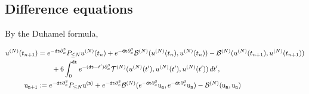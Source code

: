 \subsection{Difference equations}

By the Duhamel formula, 


    \begin{align}
        u^{(N)} (t_{n + 1}) 
            &=  e^{-\mathtt{dt} \partial_x^3}  P_{\leq N} u^{(N)}(t_n) + e^{-\mathtt{dt} \partial_x^3} \mathcal B^{(N)} (u^{(N)}(t_n), u^{(N)} (t_n)) - \mathcal B^{(N)} (u^{(N)} (t_{n + 1}), u^{(N)}(t_{n + 1})) \\
            &\qquad+ 6 \int_0^{\mathtt{dt}} e^{-(\mathtt{dt} - t') \partial_x^3} \mathcal T^{(N)} (u^{(N)}(t'), u^{(N)}(t'), u^{(N)}(t'))\, dt' ,  \\
        \mathtt{u_{n  +1}} 
            &:= e^{- \mathtt{dt} \partial_x^3} P_{\leq N} \mathtt{u^{(n)}} + e^{-\mathtt{dt} \partial_x^3} \mathcal B^{(N)} (e^{-\mathtt{dt} \partial_x^3} \mathtt{u_n}, e^{-\mathtt{dt} \partial_x^3} \mathtt{u_n}) - \mathcal B^{(N)} (\mathtt{u_n},\mathtt{u_n})
    \end{align}

